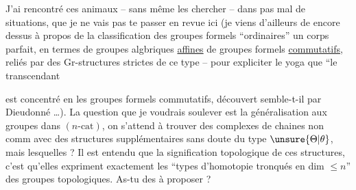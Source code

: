 J'ai rencontré ces animaux -- sans même les chercher -- dans pas mal de situations, que je ne vais pas te passer en revue ici (je viens d'ailleurs de  encore dessus à propos de la classification des groupes formels ``ordinaires''  un corps parfait, en termes de groupes algbriques \uline{affines}\unsure{,|;} de groupes formels \uline{commutatifs}, reliés par des Gr-structures strictes de ce type%
 -- pour expliciter le yoga que ``le  transcendant 

  est concentré en les groupes formels commutatifs, découvert semble-t-il par Dieudonné \dots). La question que je voudrais soulever est la généralisation aux groupes dans $(n\text{-cat})$, on s'attend à trouver des complexes de chaines non comm
avec des structures supplémentaires sans doute du type $\unsure{\Theta|\theta}$, mais lesquelles ? Il est entendu que la signification topologique de ces structures, c'est qu'elles expriment exactement les ``types d'homotopie tronqués en dim $\leq n$'' des groupes topologiques. 
As-tu des  à proposer ?

